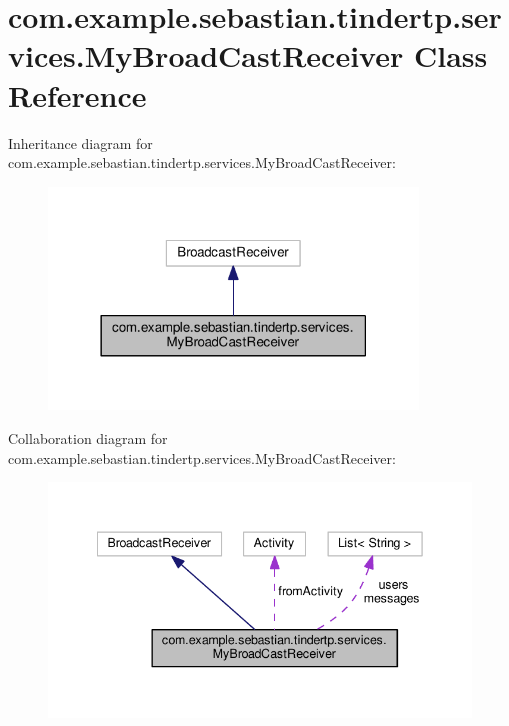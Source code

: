 \hypertarget{classcom_1_1example_1_1sebastian_1_1tindertp_1_1services_1_1MyBroadCastReceiver}{}\section{com.\+example.\+sebastian.\+tindertp.\+services.\+My\+Broad\+Cast\+Receiver Class Reference}
\label{classcom_1_1example_1_1sebastian_1_1tindertp_1_1services_1_1MyBroadCastReceiver}


Inheritance diagram for com.\+example.\+sebastian.\+tindertp.\+services.\+My\+Broad\+Cast\+Receiver\+:
\nopagebreak
\begin{figure}[H]
\begin{center}
\leavevmode
\includegraphics[width=278pt]{classcom_1_1example_1_1sebastian_1_1tindertp_1_1services_1_1MyBroadCastReceiver__inherit__graph}
\end{center}
\end{figure}


Collaboration diagram for com.\+example.\+sebastian.\+tindertp.\+services.\+My\+Broad\+Cast\+Receiver\+:
\nopagebreak
\begin{figure}[H]
\begin{center}
\leavevmode
\includegraphics[width=342pt]{classcom_1_1example_1_1sebastian_1_1tindertp_1_1services_1_1MyBroadCastReceiver__coll__graph}
\end{center}
\end{figure}
